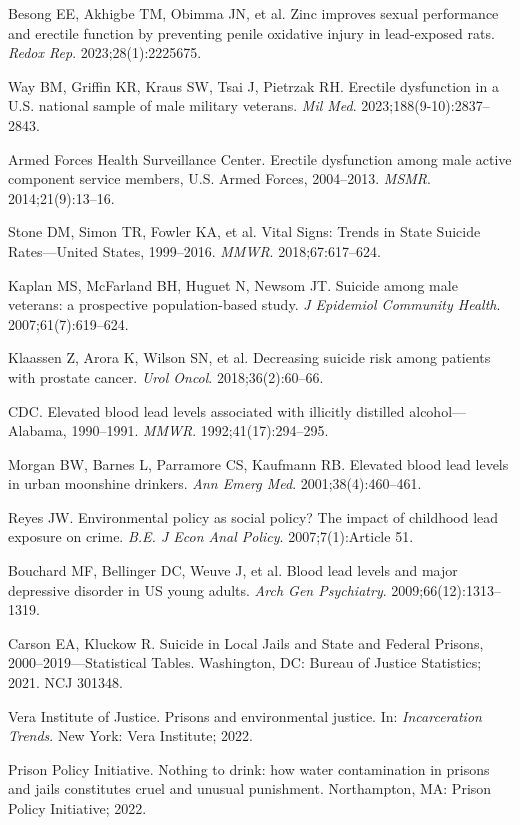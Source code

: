 \documentclass[11pt,twocolumn]{article}
\begin{document}
{\begin{enumerate}[label={[\arabic*]}, leftmargin=*, itemsep=1pt]
    \item Besong EE, Akhigbe TM, Obimma JN, et al. Zinc improves sexual performance and erectile function by preventing penile oxidative injury in lead-exposed rats. \textit{Redox Rep}. 2023;28(1):2225675.
    \item Way BM, Griffin KR, Kraus SW, Tsai J, Pietrzak RH. Erectile dysfunction in a U.S. national sample of male military veterans. \textit{Mil Med}. 2023;188(9-10):2837--2843.
    \item Armed Forces Health Surveillance Center. Erectile dysfunction among male active component service members, U.S. Armed Forces, 2004--2013. \textit{MSMR}. 2014;21(9):13--16.
    \item Stone DM, Simon TR, Fowler KA, et al. Vital Signs: Trends in State Suicide Rates---United States, 1999--2016. \textit{MMWR}. 2018;67:617--624.
    \item Kaplan MS, McFarland BH, Huguet N, Newsom JT. Suicide among male veterans: a prospective population-based study. \textit{J Epidemiol Community Health}. 2007;61(7):619--624.
    \item Klaassen Z, Arora K, Wilson SN, et al. Decreasing suicide risk among patients with prostate cancer. \textit{Urol Oncol}. 2018;36(2):60--66.
    \item CDC. Elevated blood lead levels associated with illicitly distilled alcohol---Alabama, 1990--1991. \textit{MMWR}. 1992;41(17):294--295.
    \item Morgan BW, Barnes L, Parramore CS, Kaufmann RB. Elevated blood lead levels in urban moonshine drinkers. \textit{Ann Emerg Med}. 2001;38(4):460--461.
    \item Reyes JW. Environmental policy as social policy? The impact of childhood lead exposure on crime. \textit{B.E. J Econ Anal Policy}. 2007;7(1):Article 51.
    \item Bouchard MF, Bellinger DC, Weuve J, et al. Blood lead levels and major depressive disorder in US young adults. \textit{Arch Gen Psychiatry}. 2009;66(12):1313--1319.
    \item Carson EA, Kluckow R. Suicide in Local Jails and State and Federal Prisons, 2000--2019---Statistical Tables. Washington, DC: Bureau of Justice Statistics; 2021. NCJ 301348.
    \item Vera Institute of Justice. Prisons and environmental justice. In: \textit{Incarceration Trends}. New York: Vera Institute; 2022.
    \item Prison Policy Initiative. Nothing to drink: how water contamination in prisons and jails constitutes cruel and unusual punishment. Northampton, MA: Prison Policy Initiative; 2022.

\end{enumerate}}
\end{document}
